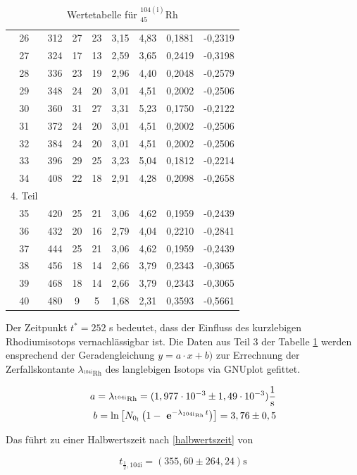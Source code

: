 \begin{table}[H]
\begin{tabular}{c|c|c|c|c|c|c|c}
26&	312&	27&	23&	3,15&	4,83&	0,1881&	-0,2319\\
27&	324&	17&	13&	2,59&	3,65&	0,2419&	-0,3198\\
28&	336&	23&	19&	2,96&	4,40&	0,2048&	-0,2579\\
29&	348&	24&	20&	3,01&	4,51&	0,2002&	-0,2506\\
30&	360&	31&	27&	3,31&	5,23&	0,1750&	-0,2122\\
31&	372&	24&	20&	3,01&	4,51&	0,2002&	-0,2506\\
32&	384&	24&	20&	3,01&	4,51&	0,2002&	-0,2506\\
33&	396&	29&	25&	3,23&	5,04&	0,1812&	-0,2214\\
34&	408&	22&	18&	2,91&	4,28&	0,2098&	-0,2658\\
\hline
4. Teil \\
\hline
35&	420&	25&	21&	3,06&	4,62&	0,1959&	-0,2439\\
36&	432&	20&	16&	2,79&	4,04&	0,2210&	-0,2841\\
37&	444&	25&	21&	3,06&	4,62&	0,1959&	-0,2439\\
38&	456&	18&	14&	2,66&	3,79&	0,2343&	-0,3065\\
39&	468&	18&	14&	2,66&	3,79&	0,2343&	-0,3065\\
40&	480&	9&	5&	1,68&	2,31&	0,3593&	-0,5661\\

\end{tabular}
\caption{Wertetabelle für $^{104(\text{i})}_{45}$Rh}
\label{tabrhod}
\end{table}
\renewcommand{\arraystretch}{1}

Der Zeitpunkt $t^* = 252$ s bedeutet, dass der Einfluss des kurzlebigen Rhodiumisotops vernachlässigbar ist. Die Daten aus Teil 3 der 
Tabelle \ref{tabrhod} werden ensprechend der Geradengleichung $y = a\cdot x + b)$ zur Errechnung der Zerfallskontante $\lambda_{^{104\text{i}}\text{Rh}}$ des langlebigen Isotops
via GNUplot gefittet. 

\begin{align}
a = \lambda_{^{104\text{i}}\text{Rh}} = (1,977\cdot 10^{-3} \pm 1,49 \cdot 10^{-3}) \frac{1}{\text{s}}\\
b = \ln\left[N_{0_l}\left(1-\ \mathbf{e}^{-\lambda_{^{104\text{i}}\text{Rh}}\,t}\right)\right] = 3,76 \pm 0,5
\end{align}

Das führt zu einer Halbwertszeit nach \eqref{halbwertszeit} von

\begin{equation}
   t_{\frac12,\text{104i}} = (355,60 \pm 264,24) \text{s}
\label{rh1}
\end{equation}


